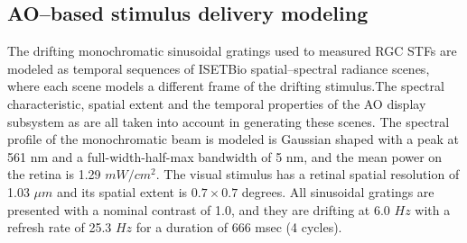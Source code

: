 \documentclass[11pt, oneside]{article}   	%
\begin{document}
\subsection{AO--based stimulus delivery modeling}
The drifting monochromatic sinusoidal gratings used to measured RGC STFs are modeled as temporal sequences of ISETBio spatial--spectral radiance scenes, where each scene models a different frame of the drifting stimulus.The spectral characteristic, spatial extent and the temporal properties of the AO display subsystem as are all taken into account in generating these scenes. The spectral profile of the monochromatic beam is modeled is Gaussian shaped with a peak at 561 nm and a full-width-half-max bandwidth of 5 nm, and the mean power on the retina is 1.29 $mW / cm^2$. The visual stimulus has a retinal spatial resolution of 1.03 $\mu m$ and its spatial extent is $0.7 \times 0.7$ degrees. All sinusoidal gratings are presented with a nominal contrast of 1.0, and they are drifting at 6.0 $Hz$ with a refresh rate of 25.3 $Hz$ for a duration of 666 msec (4 cycles). 
\end{document}
